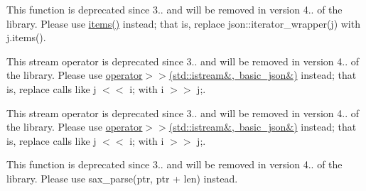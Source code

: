 \begin{DoxyRefList}
%
This function is deprecated since 3.. and will be removed in version 4.. of the library. Please use \mbox{\hyperlink{classbasic__json_a164b219291271e36e427d6b9c9916fec}{items()}} instead; that is, replace {\ttfamily json\+::iterator\+\_\+wrapper(j)} with {\ttfamily j.\+items()}.  
\item[Member \mbox{\hyperlink{classbasic__json_af9907af448f7ff794120033e132025f6}{basic\+\_\+json\texorpdfstring{$<$}{<} Object\+Type, Array\+Type, String\+Type, Boolean\+Type, Number\+Integer\+Type, Number\+Unsigned\+Type, Number\+Float\+Type, Allocator\+Type, JSONSerializer, Binary\+Type \texorpdfstring{$>$}{>}\+::operator\texorpdfstring{$<$}{<}\texorpdfstring{$<$}{<}}} (\mbox{\hyperlink{classbasic__json}{basic\+\_\+json}} \&j, std\+::istream \&i)]\label{deprecated__deprecated000004}%
%
This stream operator is deprecated since 3.. and will be removed in version 4.. of the library. Please use \mbox{\hyperlink{classbasic__json_aea0de29387d532e0bc5f2475cb83995d}{operator$>$$>$(std\+::istream\&, basic\+\_\+json\&)}} instead; that is, replace calls like {\ttfamily j \texorpdfstring{$<$}{<}\texorpdfstring{$<$}{<} i;} with {\ttfamily i \texorpdfstring{$>$}{>}\texorpdfstring{$>$}{>} j;}. 

\label{deprecated__deprecated000008}%
%
This stream operator is deprecated since 3.. and will be removed in version 4.. of the library. Please use \mbox{\hyperlink{classbasic__json_aea0de29387d532e0bc5f2475cb83995d}{operator$>$$>$(std\+::istream\&, basic\+\_\+json\&)}} instead; that is, replace calls like {\ttfamily j \texorpdfstring{$<$}{<}\texorpdfstring{$<$}{<} i;} with {\ttfamily i \texorpdfstring{$>$}{>}\texorpdfstring{$>$}{>} j;}.  
\item[Member \mbox{\hyperlink{classbasic__json_a696ab4a7073c479bb1ef24c23c3d3d67}{basic\+\_\+json\texorpdfstring{$<$}{<} Object\+Type, Array\+Type, String\+Type, Boolean\+Type, Number\+Integer\+Type, Number\+Unsigned\+Type, Number\+Float\+Type, Allocator\+Type, JSONSerializer, Binary\+Type \texorpdfstring{$>$}{>}\+::sax\+\_\+parse}} (\mbox{\hyperlink{classdetail_1_1span__input__adapter}{detail\+::span\+\_\+input\+\_\+adapter}} \&\&i, SAX $\ast$sax, input\+\_\+format\+\_\+t format=input\+\_\+format\+\_\+t\+::json, const bool strict=true, const bool ignore\+\_\+comments=false)]\label{deprecated__deprecated000003}%
%
This function is deprecated since 3.. and will be removed in version 4.. of the library. Please use sax\+\_\+parse(ptr, ptr + len) instead. 


\end{DoxyRefList}
